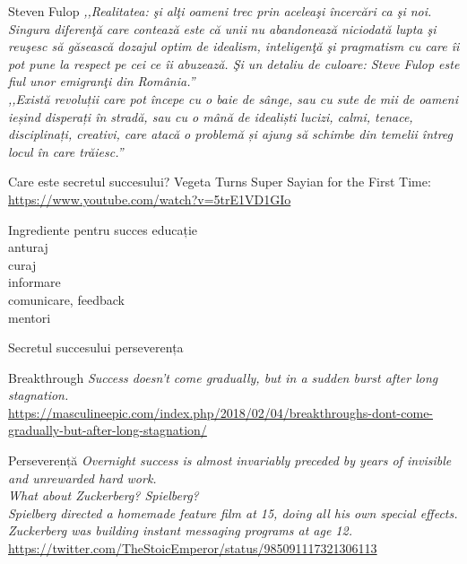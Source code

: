 \documentclass{simple}
\begin{document}
\begin{frame}{Steven Fulop}
  \pause \textit{,,Realitatea: şi alţi oameni trec prin aceleaşi încercări ca şi noi. Singura diferenţă care contează este că unii nu abandonează niciodată lupta şi reuşesc să găsească dozajul optim de idealism, inteligenţă şi pragmatism cu care îi pot pune la respect pe cei ce îi abuzează. Şi un detaliu de culoare: Steve Fulop este fiul unor emigranţi din România.''} \\
  \pause \textit{,,Există revoluții care pot începe cu o baie de sânge, sau cu sute de mii de oameni ieșind disperați în stradă, sau cu o mână de idealiști lucizi, calmi, tenace, disciplinați, creativi, care atacă o problemă și ajung să schimbe din temelii întreg locul în care trăiesc.''}
\end{frame}

\begin{frame}{Care este secretul succesului?}
  \centering
  Vegeta Turns Super Sayian for the First Time: \url{https://www.youtube.com/watch?v=5trE1VD1GIo}
\end{frame}

\begin{frame}{Ingrediente pentru succes}
  \centering
  \pause educație \\
  \pause anturaj \\
  \pause curaj \\
  \pause informare \\
  \pause comunicare, feedback \\
  \pause mentori
\end{frame}

\begin{frame}{Secretul succesului}
  \centering
  \pause \Large{perseverența}
\end{frame}

\begin{frame}{Breakthrough}
  \centering
  \textit{Success doesn't come gradually, but in a sudden burst after long stagnation.}\\
  \vspace{3mm}
  \tiny{\url{https://masculineepic.com/index.php/2018/02/04/breakthroughs-dont-come-gradually-but-after-long-stagnation/}}
\end{frame}

\begin{frame}{Perseverență}
  \centering
  \textit{Overnight success is almost invariably preceded by years of invisible and unrewarded hard work.}\\
  \vspace{2mm}
  \textit{What about Zuckerberg? Spielberg?}\\
  \vspace{2mm}
  \textit{Spielberg directed a homemade feature film at 15, doing all his own special effects.}\\
  \vspace{2mm}
  \textit{Zuckerberg was building instant messaging programs at age 12.}\\
  \vspace{3mm}
  \tiny{\url{https://twitter.com/TheStoicEmperor/status/985091117321306113}}
\end{frame}
\end{document}
